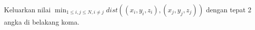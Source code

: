 Keluarkan nilai $\min_{1\le{i,j}\le{N},i\neq{j}}{dist((x_i,y_i,z_i),(x_j,y_j,z_j))}$ dengan tepat 2 angka di belakang koma.